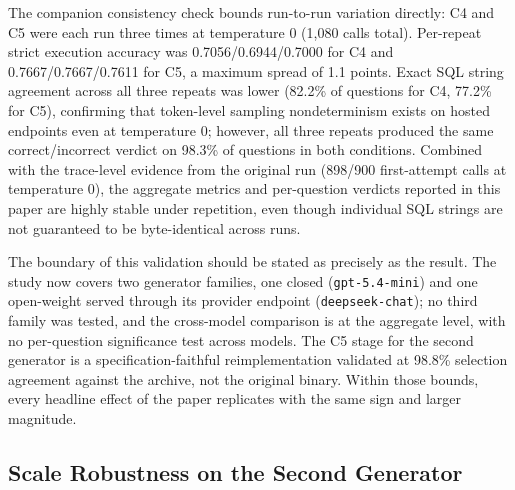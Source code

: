 \documentclass{ieeeaccess}
\begin{document}
The companion consistency check bounds run-to-run variation directly: C4 and C5 were each run three times at temperature 0 (1{,}080 calls total). Per-repeat strict execution accuracy was 0.7056/0.6944/0.7000 for C4 and 0.7667/0.7667/0.7611 for C5, a maximum spread of 1.1 points. Exact SQL string agreement across all three repeats was lower (82.2\% of questions for C4, 77.2\% for C5), confirming that token-level sampling nondeterminism exists on hosted endpoints even at temperature 0; however, all three repeats produced the same correct/incorrect verdict on 98.3\% of questions in both conditions. Combined with the trace-level evidence from the original run (898/900 first-attempt calls at temperature 0), the aggregate metrics and per-question verdicts reported in this paper are highly stable under repetition, even though individual SQL strings are not guaranteed to be byte-identical across runs.

The boundary of this validation should be stated as precisely as the result. The study now covers two generator families, one closed (\texttt{gpt-5.4-mini}) and one open-weight served through its provider endpoint (\texttt{deepseek-chat}); no third family was tested, and the cross-model comparison is at the aggregate level, with no per-question significance test across models. The C5 stage for the second generator is a specification-faithful reimplementation validated at 98.8\% selection agreement against the archive, not the original binary. Within those bounds, every headline effect of the paper replicates with the same sign and larger magnitude.

\subsection{Scale Robustness on the Second Generator}\label{scale-robustness}
\end{document}
